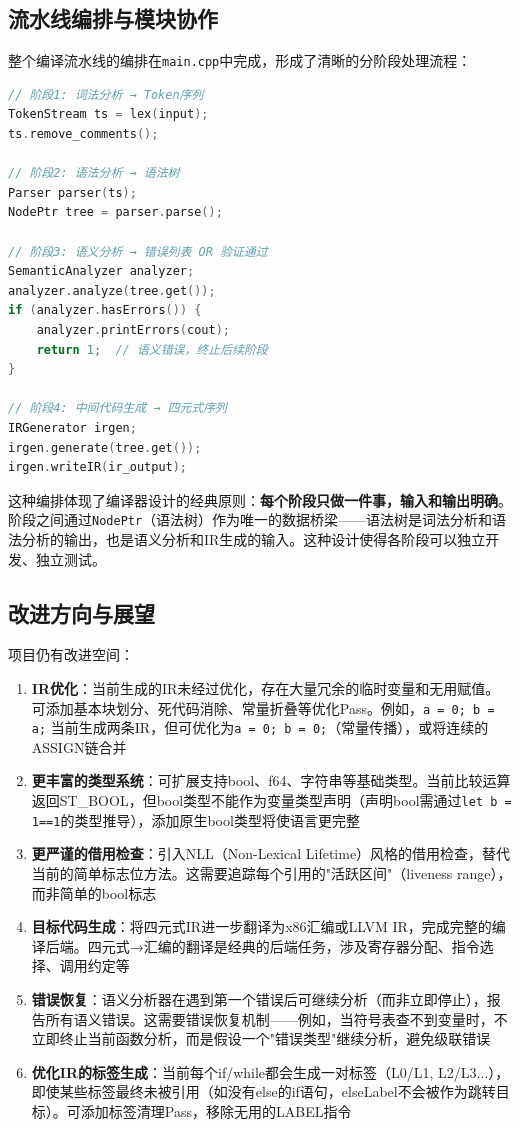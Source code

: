 \documentclass[12pt,a4paper]{ctexart}
\begin{document}
\subsection{流水线编排与模块协作}

整个编译流水线的编排在\texttt{main.cpp}中完成，形成了清晰的分阶段处理流程：

\begin{lstlisting}[language=C++, caption={main.cpp中的编译流水线编排}]
// 阶段1: 词法分析 → Token序列
TokenStream ts = lex(input);
ts.remove_comments();

// 阶段2: 语法分析 → 语法树
Parser parser(ts);
NodePtr tree = parser.parse();

// 阶段3: 语义分析 → 错误列表 OR 验证通过
SemanticAnalyzer analyzer;
analyzer.analyze(tree.get());
if (analyzer.hasErrors()) {
    analyzer.printErrors(cout);
    return 1;  // 语义错误，终止后续阶段
}

// 阶段4: 中间代码生成 → 四元式序列
IRGenerator irgen;
irgen.generate(tree.get());
irgen.writeIR(ir_output);
\end{lstlisting}

这种编排体现了编译器设计的经典原则：\textbf{每个阶段只做一件事，输入和输出明确}。阶段之间通过\texttt{NodePtr}（语法树）作为唯一的数据桥梁——语法树是词法分析和语法分析的输出，也是语义分析和IR生成的输入。这种设计使得各阶段可以独立开发、独立测试。

\subsection{改进方向与展望}

项目仍有改进空间：

\begin{enumerate}
    \item \textbf{IR优化}：当前生成的IR未经过优化，存在大量冗余的临时变量和无用赋值。可添加基本块划分、死代码消除、常量折叠等优化Pass。例如，\texttt{a = 0; b = a;} 当前生成两条IR，但可优化为\texttt{a = 0; b = 0;}（常量传播），或将连续的ASSIGN链合并
    \item \textbf{更丰富的类型系统}：可扩展支持bool、f64、字符串等基础类型。当前比较运算返回ST\_BOOL，但bool类型不能作为变量类型声明（声明bool需通过\texttt{let b = 1==1}的类型推导），添加原生bool类型将使语言更完整
    \item \textbf{更严谨的借用检查}：引入NLL（Non-Lexical Lifetime）风格的借用检查，替代当前的简单标志位方法。这需要追踪每个引用的"活跃区间"（liveness range），而非简单的bool标志
    \item \textbf{目标代码生成}：将四元式IR进一步翻译为x86汇编或LLVM IR，完成完整的编译后端。四元式→汇编的翻译是经典的后端任务，涉及寄存器分配、指令选择、调用约定等
    \item \textbf{错误恢复}：语义分析器在遇到第一个错误后可继续分析（而非立即停止），报告所有语义错误。这需要错误恢复机制——例如，当符号表查不到变量时，不立即终止当前函数分析，而是假设一个"错误类型"继续分析，避免级联错误
    \item \textbf{优化IR的标签生成}：当前每个if/while都会生成一对标签（L0/L1, L2/L3...），即使某些标签最终未被引用（如没有else的if语句，elseLabel不会被作为跳转目标）。可添加标签清理Pass，移除无用的LABEL指令
\end{enumerate}
\end{document}
